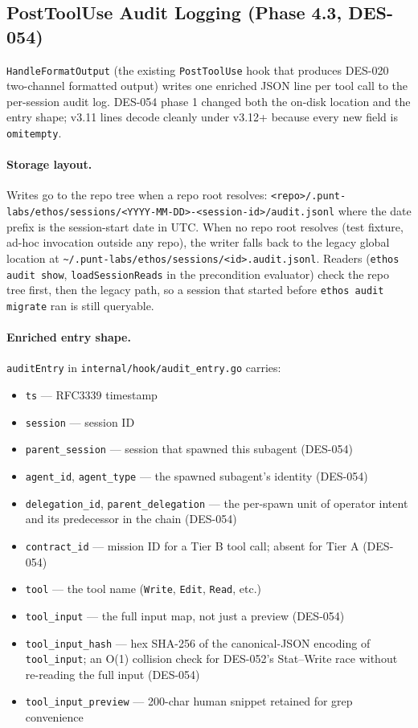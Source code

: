\documentclass[a4paper,10pt]{article}
\newcommand{\field}[1]{\texttt{#1}}
\newcommand{\cmd}[1]{\texttt{#1}}
\newcommand{\fpath}[1]{\texttt{#1}}
\begin{document}
\subsection{PostToolUse Audit Logging (Phase 4.3, DES-054)}

\texttt{HandleFormatOutput} (the existing \texttt{PostToolUse} hook
that produces DES-020 two-channel formatted output) writes one
enriched JSON line per tool call to the per-session audit log.
DES-054 phase 1 changed both the on-disk location and the entry
shape; v3.11 lines decode cleanly under v3.12+ because every new
field is \texttt{omitempty}.

\paragraph{Storage layout.}  Writes go to the repo tree when a
repo root resolves:
\fpath{<repo>/.punt-labs/ethos/sessions/<YYYY-MM-DD>-<session-id>/audit.jsonl}
where the date prefix is the session-start date in UTC.  When no
repo root resolves (test fixture, ad-hoc invocation outside any
repo), the writer falls back to the legacy global location at
\fpath{\~{}/.punt-labs/ethos/sessions/<id>.audit.jsonl}.  Readers
(\cmd{ethos audit show}, \texttt{loadSessionReads} in the
precondition evaluator) check the repo tree first, then the
legacy path, so a session that started before \cmd{ethos audit
migrate} ran is still queryable.

\paragraph{Enriched entry shape.}
\texttt{auditEntry} in \fpath{internal/hook/audit\_entry.go} carries:

\begin{itemize}
  \item \field{ts} --- RFC3339 timestamp
  \item \field{session} --- session ID
  \item \field{parent\_session} --- session that spawned this
    subagent (DES-054)
  \item \field{agent\_id}, \field{agent\_type} --- the spawned
    subagent's identity (DES-054)
  \item \field{delegation\_id}, \field{parent\_delegation} ---
    the per-spawn unit of operator intent and its predecessor
    in the chain (DES-054)
  \item \field{contract\_id} --- mission ID for a Tier B tool
    call; absent for Tier A (DES-054)
  \item \field{tool} --- the tool name (\texttt{Write},
    \texttt{Edit}, \texttt{Read}, etc.)
  \item \field{tool\_input} --- the full input map, not just a
    preview (DES-054)
  \item \field{tool\_input\_hash} --- hex SHA-256 of the
    canonical-JSON encoding of \field{tool\_input}; an O(1)
    collision check for DES-052's Stat--Write race without
    re-reading the full input (DES-054)
  \item \field{tool\_input\_preview} --- 200-char human snippet
    retained for grep convenience
\end{itemize}
\end{document}

